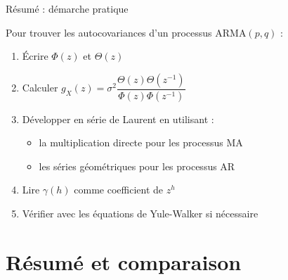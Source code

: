 \documentclass[11pt,aspectratio=169]{beamer}
\begin{document}
\begin{frame}{Résumé : démarche pratique}

Pour trouver les autocovariances d'un processus ARMA$(p,q)$ :

\begin{enumerate}

\item Écrire $\Phi(z)$ et $\Theta(z)$\newline

\item Calculer $g_X(z) = \sigma^2 \dfrac{\Theta(z)\Theta(z^{-1})}{\Phi(z)\Phi(z^{-1})}$\newline

\item Développer en série de Laurent en utilisant :
  \begin{itemize}
  \item la multiplication directe pour les processus MA\newline
  \item les séries géométriques pour les processus AR\newline
  \end{itemize}

\item Lire $\gamma(h)$ comme coefficient de $z^h$\newline

\item Vérifier avec les équations de Yule-Walker si nécessaire

\end{enumerate}

\end{frame}



\section{Résumé et comparaison}
\end{document}
